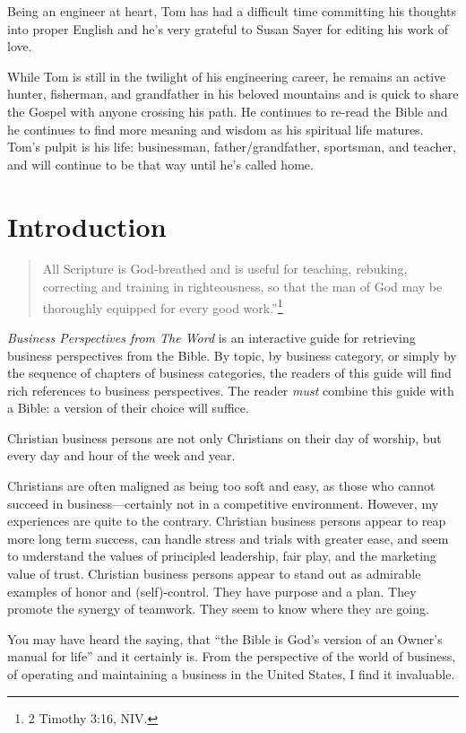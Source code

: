 \documentclass[12pt]{memoir}
\begin{document}
Being an engineer at heart, Tom has had a difficult time committing his thoughts into proper English and he's very grateful to Susan Sayer for editing his work of love.

While Tom is still in the twilight of his engineering career, he remains an active hunter, fisherman, and grandfather in his beloved mountains and is quick to share the Gospel with anyone crossing his path. He continues to re-read the Bible and he continues to find more meaning and wisdom as his spiritual life matures. Tom's pulpit is his life: businessman, father\slash{}grandfather, sportsman, and teacher, and will continue to be that way until he's called home.   


\chapter{Introduction}

\begin{quote}
All Scripture is God-breathed and is useful for teaching, rebuking, correcting and training in righteousness, so that the man of God may be thoroughly equipped for every good work.''\footnote{2 Timothy 3:16, NIV.}
\end{quote}

\emph{Business Perspectives from The Word} is an interactive
guide for retrieving business perspectives from the Bible. By topic,
by business category, or simply by the sequence of chapters of business
categories, the readers of this guide will find rich references to
business perspectives. The reader \emph{must} combine this guide with a Bible: a version of their choice will suffice.

Christian business persons are not only Christians on their day of
worship, but every day and hour of the week and year.

Christians are often maligned as being too soft and easy, as those who cannot succeed in business---certainly not in a competitive environment. However, my experiences are quite to the contrary. Christian business
persons appear to reap more long term success, can handle stress and
trials with greater ease, and seem to understand the values of principled
leadership, fair play, and the marketing value of trust. Christian
business persons appear to stand out as admirable examples of honor
and (self)-control. They have purpose and a plan. They promote the
synergy of teamwork. They seem to know where they are going.

You may have heard the saying, that ``the Bible is God's version
of an Owner's manual for life'' and it certainly is. From the perspective
of the world of business, of operating and maintaining a business
in the United States, I find it invaluable.
\end{document}

